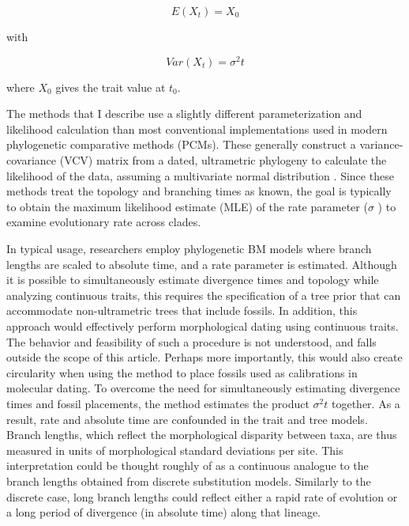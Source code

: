 \documentclass[12pt]{article}
\begin{document}
\begin{equation}
 E(X_t) = X_0 
\end{equation}

with

\begin{equation}
Var(X_t) =  \sigma^2 t
\end{equation}


where $X_0$ gives the trait value at $t_0$.

The methods that I describe use a slightly different parameterization
and likelihood calculation than most conventional implementations used
in modern phylogenetic comparative methods (PCMs). These generally
construct a variance-covariance (VCV) matrix from a dated, ultrametric
phylogeny to calculate the likelihood of the data, assuming a
multivariate normal distribution \citep{butler2004phylogenetic,o2006testing}. Since these methods treat the topology and
branching times as known, the goal is typically to obtain the maximum
likelihood estimate (MLE) of the rate parameter ($\sigma$ ) to examine
evolutionary rate across clades.

In typical usage, researchers employ phylogenetic BM models where branch lengths are scaled to absolute time,
 and a rate parameter is estimated.
 Although it is possible to simultaneously
estimate divergence times and topology while analyzing continuous
traits, this requires the specification
of a tree prior that can accommodate non-ultrametric trees that include
fossils. In addition, this approach would effectively perform morphological dating
 using continuous traits. The behavior and feasibility of such a procedure is not 
 understood, and falls outside the scope of this article. Perhaps more importantly,  
 this would also create circularity when
using the method to place fossils used as
calibrations in molecular dating.
 To overcome the need for simultaneously estimating
divergence times and fossil placements, the method estimates the product
$\sigma^2 t$ together. As a result, rate and absolute time are
confounded in the trait and tree models. Branch lengths, which reflect the morphological disparity
between taxa, are thus measured in units of morphological standard
deviations per site. This interpretation could be thought roughly of as
a continuous analogue to the branch lengths obtained from discrete
substitution models. Similarly to the discrete case, long branch lengths
could reflect either a rapid rate of evolution or a long period of
divergence (in absolute time) along that lineage.
\end{document}
